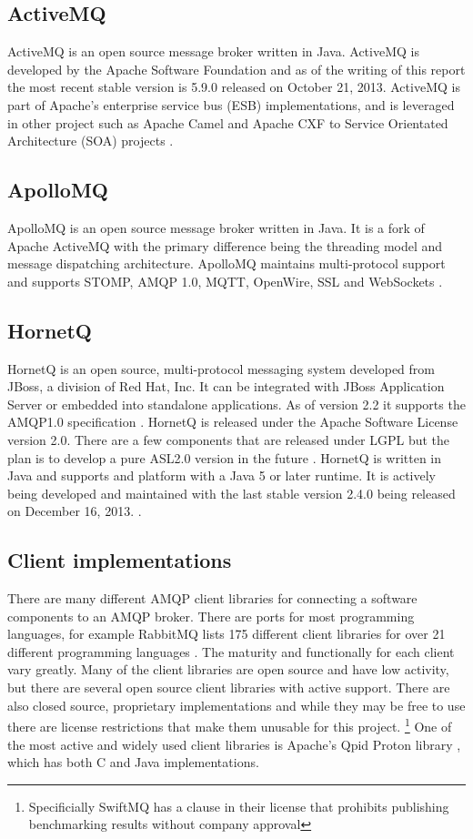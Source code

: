 \documentclass{thesis}
\begin{document}
\subsection{ActiveMQ}
ActiveMQ is an open source message broker written in Java.  ActiveMQ is developed by the Apache Software Foundation and as of the writing of this report the most recent stable version is 5.9.0 released on October 21, 2013.  ActiveMQ is part of Apache's enterprise service bus (ESB) implementations, and is leveraged in other project such as Apache Camel and Apache CXF to Service Orientated Architecture (SOA) projects \cite{ACTIVEMQ}.

\subsection{ApolloMQ}
ApolloMQ is an open source message broker written in Java.  It is a fork of Apache ActiveMQ with the primary difference being the threading model and message dispatching architecture.  ApolloMQ maintains multi-protocol support and supports STOMP, AMQP 1.0, MQTT, OpenWire, SSL and WebSockets \cite{APOLLO}.

\subsection{HornetQ}
HornetQ is an open source, multi-protocol messaging system developed from JBoss, a division of Red Hat, Inc.  It can be integrated with JBoss Application Server or embedded into standalone applications.  As of version 2.2 it supports the AMQP1.0 specification \cite{HORNETQ_ROADMAP}.  HornetQ is released under the Apache Software License version 2.0.  There are a few components that are released under LGPL but the plan is to develop a pure ASL2.0 version in the future .  HornetQ is written in Java and supports and platform with a Java 5 or later runtime.   It is actively being developed and maintained with the last stable version 2.4.0 being released on December 16, 2013. \cite{HORNETQ}.  

\subsection{Client implementations}
There are many different AMQP client libraries for connecting a software components to an AMQP broker.  There are ports for most programming languages, for example RabbitMQ lists 175 different client libraries for over 21 different programming languages \cite{RABBITMQ_CLIENTS}.  The maturity and functionally for each client vary greatly.  Many of the client libraries are open source and have low activity, but there are several open source client libraries with active support.  There are also closed source, proprietary implementations and while they may be free to use there are license restrictions that make them unusable for this project. \footnote{Specificially SwiftMQ has a clause in their license that prohibits publishing benchmarking results without company approval} One of the most active and widely used client libraries is Apache's Qpid Proton library \cite{QPID_PROTON}, which has both C and Java implementations.  
\end{document}
